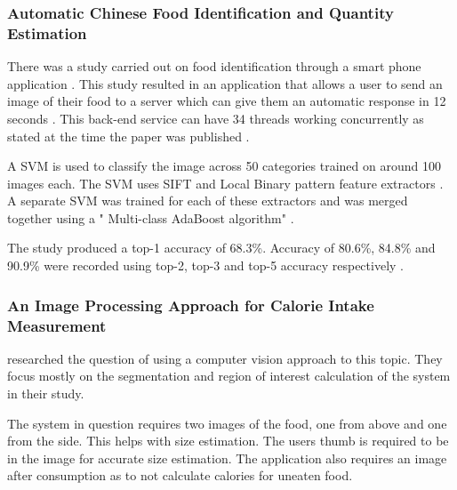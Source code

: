 
\subsubsection*{Automatic Chinese Food Identification and Quantity Estimation}
There was a study carried out on food identification through a smart phone application \parencite{chen2012automatic}.
This study resulted in an application that allows a user to send an image of their food to a server which can give them an automatic response in 12 seconds \parencite{chen2012automatic}.
This back-end service can have 34 threads working concurrently as stated at the time the paper was published \parencite{chen2012automatic}.

A SVM is used to classify the image across 50 categories trained on around 100 images each.
The SVM uses SIFT and Local Binary pattern feature extractors \parencite{chen2012automatic}.
A separate SVM was trained for each of these extractors and was merged together using a " Multi-class AdaBoost algorithm" \parencite{chen2012automatic}.

The study produced a top-1 accuracy  of 68.3\%. Accuracy of 80.6\%, 84.8\% and 90.9\% were recorded using top-2, top-3 and top-5 accuracy respectively \parencite{chen2012automatic}. 


\subsubsection*{An Image Processing Approach for Calorie Intake Measurement}
\parencite{villalobos2012image} researched the question of using a computer vision approach to this topic. They focus mostly on the segmentation and region of interest calculation of the system in their study.

The system in question requires two images of the food, one from above and one from the side. This helps with size estimation. The users thumb is required to be in the image for accurate size estimation. The application also requires an image after consumption as to not calculate calories for uneaten food.

